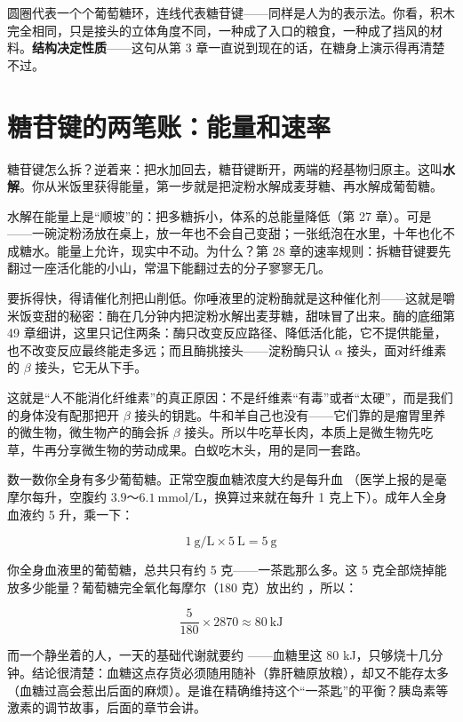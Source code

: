 圆圈代表一个个葡萄糖环，连线代表糖苷键——同样是人为的表示法。你看，积木完全相同，只是接头的立体角度不同，一种成了入口的粮食，一种成了挡风的材料。\textbf{结构决定性质}——这句从第 3 章一直说到现在的话，在糖身上演示得再清楚不过。

\section{糖苷键的两笔账：能量和速率}

糖苷键怎么拆？逆着来：把水加回去，糖苷键断开，两端的羟基物归原主。这叫\textbf{水解}。你从米饭里获得能量，第一步就是把淀粉水解成麦芽糖、再水解成葡萄糖。

水解在能量上是“顺坡”的：把多糖拆小，体系的总能量降低（第 27 章）。可是——一碗淀粉汤放在桌上，放一年也不会自己变甜；一张纸泡在水里，十年也化不成糖水。能量上允许，现实中不动。为什么？第 28 章的速率规则：拆糖苷键要先翻过一座活化能的小山，常温下能翻过去的分子寥寥无几。

要拆得快，得请催化剂把山削低。你唾液里的淀粉酶就是这种催化剂——这就是嚼米饭变甜的秘密：酶在几分钟内把淀粉水解出麦芽糖，甜味冒了出来。酶的底细第 49 章细讲，这里只记住两条：酶只改变反应路径、降低活化能，它不提供能量，也不改变反应最终能走多远；而且酶挑接头——淀粉酶只认 $\alpha$ 接头，面对纤维素的 $\beta$ 接头，它无从下手。

这就是“人不能消化纤维素”的真正原因：不是纤维素“有毒”或者“太硬”，而是我们的身体没有配那把开 $\beta$ 接头的钥匙。牛和羊自己也没有——它们靠的是瘤胃里养的微生物，微生物产的酶会拆 $\beta$ 接头。所以牛吃草长肉，本质上是微生物先吃草，牛再分享微生物的劳动成果。白蚁吃木头，用的是同一套路。

\begin{qiaoliang}
数一数你全身有多少葡萄糖。正常空腹血糖浓度大约是每升血 （医学上报的是毫摩尔每升，空腹约 $3.9$～$6.1\ \mathrm{mmol/L}$，换算过来就在每升 1 克上下）。成年人全身血液约 5 升，乘一下：

\[1\ \mathrm{g/L}\times 5\ \mathrm{L}=5\ \mathrm{g}\]

你全身血液里的葡萄糖，总共只有约 5 克——一茶匙那么多。这 5 克全部烧掉能放多少能量？葡萄糖完全氧化每摩尔（180 克）放出约 ，所以：

\[\frac{5}{180}\times 2870\approx 80\ \mathrm{kJ}\]

而一个静坐着的人，一天的基础代谢就要约 ——血糖里这 80 kJ，只够烧十几分钟。结论很清楚：血糖这点存货必须随用随补（靠肝糖原放粮），却又不能存太多（血糖过高会惹出后面的麻烦）。是谁在精确维持这个“一茶匙”的平衡？胰岛素等激素的调节故事，后面的章节会讲。
\end{qiaoliang}

